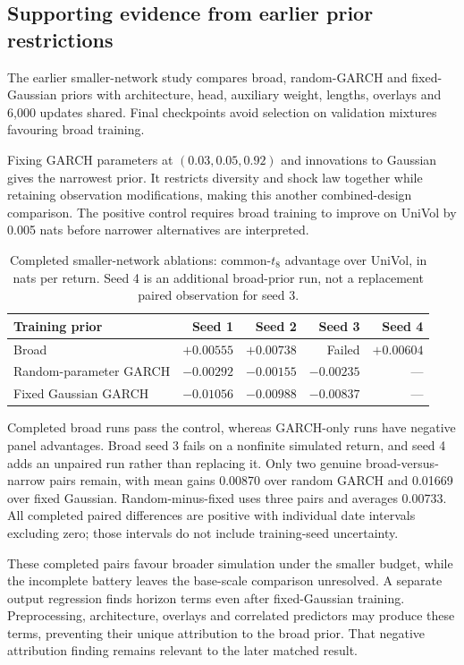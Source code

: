 \subsection{Supporting evidence from earlier prior restrictions}

The earlier smaller-network study compares broad, random-GARCH and fixed-Gaussian priors with architecture, head, auxiliary weight, lengths, overlays and 6,000 updates shared. Final checkpoints avoid selection on validation mixtures favouring broad training.

Fixing GARCH parameters at $(0.03,0.05,0.92)$ and innovations to Gaussian gives the narrowest prior. It restricts diversity and shock law together while retaining observation modifications, making this another combined-design comparison. The positive control requires broad training to improve on UniVol by 0.005 nats before narrower alternatives are interpreted.

\begin{table}[!htbp]
\centering
\caption[Completed prior-ablation runs]{Completed smaller-network ablations: common-$t_8$ advantage over UniVol, in nats per return. Seed 4 is an additional broad-prior run, not a replacement paired observation for seed 3.}
\label{tab:prior-ablation}
\small
\begin{tabular}{lrrrr}
\toprule
Training prior & Seed 1 & Seed 2 & Seed 3 & Seed 4 \\
\midrule
Broad & $+0.00555$ & $+0.00738$ & Failed & $+0.00604$ \\
Random-parameter GARCH & $-0.00292$ & $-0.00155$ & $-0.00235$ & --- \\
Fixed Gaussian GARCH & $-0.01056$ & $-0.00988$ & $-0.00837$ & --- \\
\bottomrule
\end{tabular}
\end{table}

Completed broad runs pass the control, whereas GARCH-only runs have negative panel advantages. Broad seed 3 fails on a nonfinite simulated return, and seed 4 adds an unpaired run rather than replacing it. Only two genuine broad-versus-narrow pairs remain, with mean gains 0.00870 over random GARCH and 0.01669 over fixed Gaussian. Random-minus-fixed uses three pairs and averages 0.00733. All completed paired differences are positive with individual date intervals excluding zero; those intervals do not include training-seed uncertainty.

These completed pairs favour broader simulation under the smaller budget, while the incomplete battery leaves the base-scale comparison unresolved. A separate output regression finds horizon terms even after fixed-Gaussian training. Preprocessing, architecture, overlays and correlated predictors may produce these terms, preventing their unique attribution to the broad prior. That negative attribution finding remains relevant to the later matched result.



